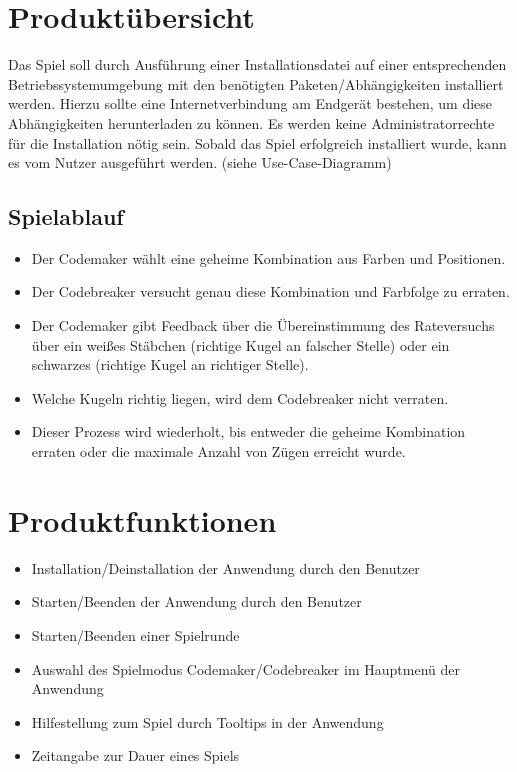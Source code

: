 \documentclass[paper=a4,fontsize=11pt,DIV14]{scrartcl}%
\numberwithin{equation}{section}
\begin{document}
\section{Produktübersicht}
Das Spiel soll durch Ausführung einer Installationsdatei auf einer entsprechenden
Betriebssystemumgebung mit den benötigten Paketen/Abhängigkeiten installiert werden.
Hierzu sollte eine Internetverbindung am Endgerät bestehen, um diese Abhängigkeiten
herunterladen zu können. Es werden keine Administratorrechte für die Installation nötig sein.
Sobald das Spiel erfolgreich installiert wurde, kann es vom Nutzer ausgeführt werden.
(siehe Use-Case-Diagramm)
\subsection{Spielablauf}
\begin{itemize}
    \item Der Codemaker wählt eine geheime Kombination aus Farben und Positionen.
    \item Der Codebreaker versucht genau diese Kombination und Farbfolge zu erraten.
    \item Der Codemaker gibt Feedback über die Übereinstimmung des Rateversuchs über ein weißes Stäbchen (richtige Kugel an falscher Stelle) oder ein schwarzes (richtige Kugel an richtiger Stelle).
    \item Welche Kugeln richtig liegen, wird dem Codebreaker nicht verraten.
    \item Dieser Prozess wird wiederholt, bis entweder die geheime Kombination erraten oder die maximale Anzahl von Zügen erreicht wurde.
\end{itemize}
\section{Produktfunktionen}
\begin{itemize}
    \item Installation/Deinstallation der Anwendung durch den Benutzer
    \item Starten/Beenden der Anwendung durch den Benutzer
    \item Starten/Beenden einer Spielrunde
    \item Auswahl des Spielmodus Codemaker/Codebreaker im Hauptmenü der Anwendung
    \item Hilfestellung zum Spiel durch Tooltips in der Anwendung
    \item Zeitangabe zur Dauer eines Spiels
\end{itemize}
\end{document}
